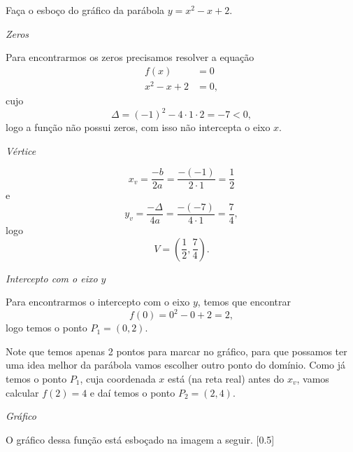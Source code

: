 \begin{example}
  Faça o esboço do gráfico da parábola
  \(
    y = x^2 - x + 2
  \).

  \solution
  \emph{Zeros}

  Para encontrarmos os zeros precisamos resolver a equação
  \begin{align*}
    f(x)    & = 0 \\
    x^2-x+2 & = 0,
  \end{align*}
  cujo
  \[
    \Delta
    = (-1)^2-4 \cdot 1 \cdot 2
    = -7
    < 0,
  \]
  logo a função não possui zeros, com isso não intercepta o eixo $x$.

  \emph{Vértice}

  \[
    x_v
    = \frac{-b}{2a}
    = \frac{-(-1)}{2 \cdot 1}
    = \frac{1}{2}
  \]
  e
  \[
    y_v
    = \frac{-\Delta}{4a}
    = \frac{-(-7)}{4 \cdot 1}
    = \frac{7}{4},
  \]
  logo
  \[
    V = \left(\frac{1}{2}, \frac{7}{4}\right).
  \]

  \emph{Intercepto com o eixo $y$}

  Para encontrarmos o intercepto com o eixo $y$,
  temos que encontrar
  \[
    f(0) = 0^2 - 0 + 2 = 2,
  \]
  logo temos o ponto $P_1=(0, 2)$.

  Note que temos apenas 2 pontos para marcar no gráfico, para que possamos ter
  uma idea melhor da parábola vamos escolher outro ponto do domínio. Como
  já temos o ponto $P_1$, cuja coordenada $x$ está (na reta real) antes do
  $x_v$, vamos calcular $f(2)=4$ e daí temos o ponto $P_2=(2, 4)$.

  \emph{Gráfico}

  O gráfico dessa função está esboçado na imagem a seguir.
  [0.5]
\end{example}


